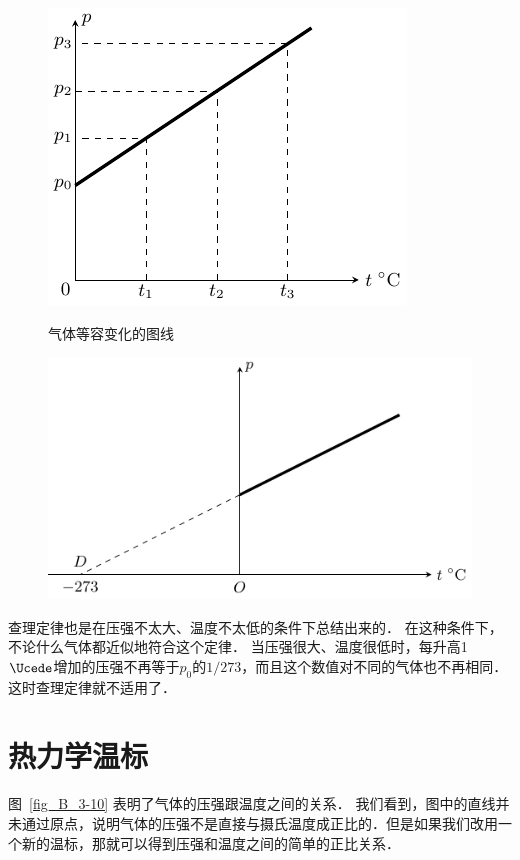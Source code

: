 \begin{figure}[htbp]
	\centering
	\begin{minipage}[t]{0.4\linewidth}
		\centering
		\includegraphics{fig/B/3-10.pdf}
		\caption{气体等容变化的图线}\label{fig_B_3-10}
	\end{minipage}
	\hfill
	\begin{minipage}[t]{0.55\linewidth}
		\centering
		\includegraphics{fig/B/3-11.pdf}
		\caption{}\label{fig_B_3-11}
	\end{minipage}
\end{figure}


查理定律也是在压强不太大、温度不太低的条件下总结出来的．
在这种条件下，不论什么气体都近似地符合这个定律．
当压强很大、温度很低时，每升高1$\Ucede$增加的压强不再等于$p_0$的$1/273$，而且这个数值对不同的气体也不再相同．这时查理定律就不适用了．


\section{热力学温标}\label{sec-B-3-4-thermodynamic-temperature-scale}
图~\ref{fig_B_3-10} 表明了气体的压强跟温度之间的关系．
我们看到，图中的直线并未通过原点，说明气体的压强不是直接与摄氏温度成正比的．但是如果我们改用一个新的温标，那就可以得到压强和温度之间的简单的正比关系．




